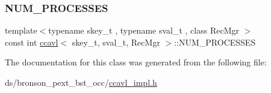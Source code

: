 \mbox{\label{classccavl_a8ccf65d91ffe06b1365ddf88e4a7c40a}} 
\subsubsection{\texorpdfstring{N\+U\+M\+\_\+\+P\+R\+O\+C\+E\+S\+S\+ES}{NUM\_PROCESSES}}
{\footnotesize\ttfamily template$<$typename skey\+\_\+t , typename sval\+\_\+t , class Rec\+Mgr $>$ \\
const int \hyperlink{classccavl}{ccavl}$<$ skey\+\_\+t, sval\+\_\+t, Rec\+Mgr $>$\+::N\+U\+M\+\_\+\+P\+R\+O\+C\+E\+S\+S\+ES}



The documentation for this class was generated from the following file\+:\begin{DoxyCompactItemize}
\item 
ds/bronson\+\_\+pext\+\_\+bst\+\_\+occ/\hyperlink{ccavl__impl_8h}{ccavl\+\_\+impl.\+h}\end{DoxyCompactItemize}
